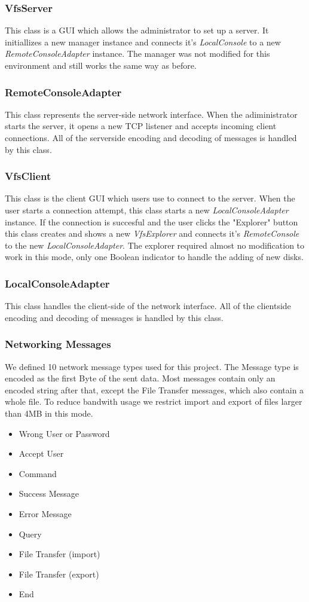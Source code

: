 \documentclass[a4paper,12pt]{article}
\begin{document}
\subsubsection{VfsServer}
This class is a GUI which allows the administrator to set up a server. It initiallizes a new manager instance and connects it's \emph{LocalConsole} to a new \emph{RemoteConsoleAdapter} instance. The manager was not modified for this environment and still works the same way as before.
\subsubsection{RemoteConsoleAdapter}
This class represents the server-side network interface. When the adiministrator starts the server, it opens a new TCP listener and accepts incoming client connections. All of the serverside encoding and decoding of messages is handled by this class.
\subsubsection{VfsClient}
This class is the client GUI which users use to connect to the server. When the user starts a connection attempt, this class starts a new \emph{LocalConsoleAdapter} instance. If the connection is succesful and the user clicks the "Explorer" button this class creates and shows  a new \emph{VfsExplorer} and connects it's \emph{RemoteConsole} to the new \emph{LocalConsoleAdapter}. The explorer required almost no modification to work in this mode, only one Boolean indicator to handle the adding of new disks.
\subsubsection{LocalConsoleAdapter}
This class handles the client-side of the network interface. All of the clientside encoding and decoding of messages is handled by this class.

\subsubsection{Networking Messages}
We defined 10 network message types used for this project. The Message type is encoded as the first Byte of the sent data. Most messages contain only an encoded string after that, except the File Transfer messages, which also contain a whole file. To reduce bandwith usage we restrict import and export of files larger than 4MB in this mode.
\begin{itemize}
\item Wrong User or Password
\item Accept User
\item Command
\item Success Message
\item Error Message
\item Query
\item File Transfer (import)
\item File Transfer (export)
\item End
\end{itemize}
\end{document}
